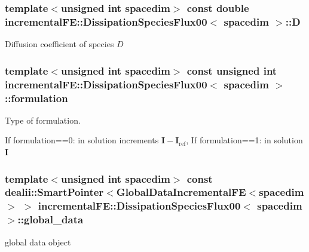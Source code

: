 \subsubsection[{\texorpdfstring{D}{D}}]{\setlength{\rightskip}{0pt plus 5cm}template$<$unsigned int spacedim$>$ const double {\bf incremental\+F\+E\+::\+Dissipation\+Species\+Flux00}$<$ spacedim $>$\+::D\hspace{0.3cm}{\ttfamily [private]}}\hypertarget{classincremental_f_e_1_1_dissipation_species_flux00_aeb62c376743048a919a6d1df5da62677}{}\label{classincremental_f_e_1_1_dissipation_species_flux00_aeb62c376743048a919a6d1df5da62677}
Diffusion coefficient of species $D$ 
\subsubsection[{\texorpdfstring{formulation}{formulation}}]{\setlength{\rightskip}{0pt plus 5cm}template$<$unsigned int spacedim$>$ const unsigned int {\bf incremental\+F\+E\+::\+Dissipation\+Species\+Flux00}$<$ spacedim $>$\+::formulation\hspace{0.3cm}{\ttfamily [private]}}\hypertarget{classincremental_f_e_1_1_dissipation_species_flux00_ab25397ec84afda11b60fbe5791a7854b}{}\label{classincremental_f_e_1_1_dissipation_species_flux00_ab25397ec84afda11b60fbe5791a7854b}
Type of formulation.

If {\ttfamily formulation==0}\+: in solution increments $\boldsymbol{I}-\boldsymbol{I}_\mathrm{ref}$, If {\ttfamily formulation==1}\+: in solution $\boldsymbol{I}$ 
\subsubsection[{\texorpdfstring{global\+\_\+data}{global_data}}]{\setlength{\rightskip}{0pt plus 5cm}template$<$unsigned int spacedim$>$ const dealii\+::\+Smart\+Pointer$<${\bf Global\+Data\+Incremental\+FE}$<$spacedim$>$ $>$ {\bf incremental\+F\+E\+::\+Dissipation\+Species\+Flux00}$<$ spacedim $>$\+::global\+\_\+data\hspace{0.3cm}{\ttfamily [private]}}\hypertarget{classincremental_f_e_1_1_dissipation_species_flux00_a65f9537f13becd5ee6dfaf597e4e5710}{}\label{classincremental_f_e_1_1_dissipation_species_flux00_a65f9537f13becd5ee6dfaf597e4e5710}
global data object 
